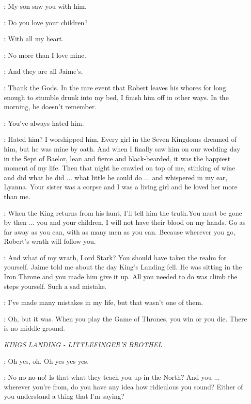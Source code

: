 \NED: My son saw you with him. 

\CERSEI: Do you love your children? 

\NED: With all my heart. 

\CERSEI: No more than I love mine. 

\NED: And they are all Jaime's. 

\CERSEI: Thank the Gods. In the rare event that Robert leaves his whores for long enough to stumble drunk into my bed, I finish him off in other ways. In the morning, he doesn't remember. 

\NED: You've always hated him. 

\CERSEI: Hated him? I worshipped him. Every girl in the Seven Kingdoms dreamed of him, but he was mine by oath. And when I finally saw him on our wedding day in the Sept of Baelor, lean and fierce and black-bearded, it was the happiest moment of my life. Then that night he crawled on top of me, stinking of wine and did what he did $\ldots$ what little he could do $\ldots$ and whispered in my ear, Lyanna. Your sister was a corpse and I was a living girl and he loved her more than me. 

\NED: When the King returns from his hunt, I'll tell him the truth.You must be gone by then $\ldots$ you and your children.  I will not have their blood on my hands.  Go as far away as you can, with as many men as you can.  Because wherever you go, Robert's wrath will follow you. 

\CERSEI: And what of my wrath, Lord Stark?  You should have taken the realm for yourself.  Jaime told me about the day King's Landing fell.  He was sitting in the Iron Throne and you made him give it up.  All you needed to do was climb the steps yourself.  Such a sad mistake. 

\NED: I've made many mistakes in my life, but that wasn't one of them. 

\CERSEI: Oh, but it was.  When you play the Game of Thrones, you win or you die.  There is no middle ground. 


\scene

\textit{KINGS LANDING - LITTLEFINGER'S BROTHEL} 


\ROS: Oh yes, oh. Oh yes yes yes. 

\LITTLEFINGER: No no no no! Is that what they teach you up in the North? And you $\ldots$ wherever you're from, do you have any idea how ridiculous you sound? Either of you understand a thing that I'm saying? 

